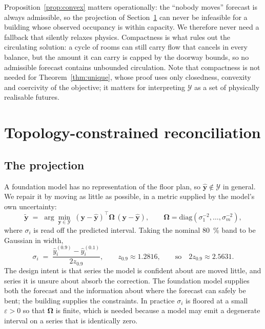 \documentclass[11pt]{article}
\theoremstyle{plain}
\theoremstyle{definition}
\theoremstyle{remark}
\newcommand{\by}{\bm{y}}
\newcommand{\bOm}{\bm{\Omega}}
\newcommand{\yhat}{\hat{\by}}
\newcommand{\ytil}{\tilde{\by}}
\newcommand{\cY}{\mathcal{Y}}
\newif\ifrevisionmarkup
\newcommand{\new}[1]{\ifrevisionmarkup\textcolor{revision}{#1}\else#1\fi}
\begin{document}
Proposition~\ref{prop:convex} matters operationally: the ``nobody moves'' forecast is always admissible, so the projection of Section~\ref{sec:method} can never be infeasible for a building whose observed occupancy is within capacity. We therefore never need a fallback that silently relaxes physics. \new{Compactness is what rules out the circulating solution: a cycle of rooms can still carry flow that cancels in every balance, but the amount it can carry is capped by the doorway bounds, so no admissible forecast contains unbounded circulation. Note that compactness is not needed for Theorem~\ref{thm:unique}, whose proof uses only closedness, convexity and coercivity of the objective; it matters for interpreting $\cY$ as a set of physically realisable futures.}

\section{Topology-constrained reconciliation}
\label{sec:method}

\subsection{The projection}

A foundation model has no representation of the floor plan, so $\yhat \notin \cY$ in general. We repair it by moving as little as possible, in a metric supplied by the model's own uncertainty:
\begin{equation}
\ytil \;=\; \arg\min_{\by \in \cY} \; (\by - \yhat)^{\top} \bOm \, (\by - \yhat),
\qquad
\bOm = \mathrm{diag}\!\left(\sigma_1^{-2},\dots,\sigma_m^{-2}\right),
\label{eq:qp}
\end{equation}
where $\sigma_i$ is read off the predicted interval. Taking the nominal \SI{80}{\percent} band to be Gaussian in width,
\begin{equation}
\sigma_i \;=\; \frac{\hat{y}^{(0.9)}_i - \hat{y}^{(0.1)}_i}{2 z_{0.9}},
\qquad z_{0.9} \approx 1.2816,
\qquad \text{so} \quad 2 z_{0.9} \approx 2.5631 .
\label{eq:sigma}
\end{equation}
The design intent is that series the model is confident about are moved little, and series it is unsure about absorb the correction. The foundation model supplies both the forecast and the information about where the forecast can safely be bent; the building supplies the constraints. In practice $\sigma_i$ is floored at a small $\varepsilon>0$ so that $\bOm$ is finite, which is needed because a model may emit a degenerate interval on a series that is identically zero.
\end{document}
